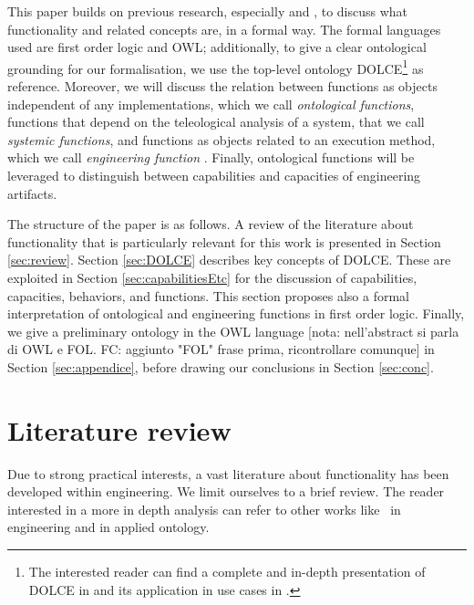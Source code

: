 \documentclass[sw]{iosart2x}
\newcommand{\DOLCE}{\textsc{DOLCE}\xspace} %
\newcommand{\OWL}{\textnormal{OWL}\xspace}
\newcommand{\firstTimeKeyWord}[1]{\textit{#1}}
\newcommand{\TODO}[1]{{\color{red} #1}}
\begin{document}
This paper builds on previous research, especially \cite{borgoCapabilitiesCapacitiesFunctionalities2021} and \cite{mizoguchiUnifyingDefinitionArtifact2016}, to discuss what functionality and related concepts are, in a formal way. 
The formal languages used are first order logic and \OWL; additionally, to give a clear ontological grounding for our formalisation, we use the top-level ontology \DOLCE\footnote{The interested reader can find a complete and in-depth presentation of \DOLCE in \cite{masoloWonderWebDeliverableD182003} and its application in use cases in \cite{borgoDOLCEDescriptiveOntology2022}.} as reference. 
Moreover, we will discuss the relation between functions as objects independent of any implementations, which we call \firstTimeKeyWord{ontological functions}, functions that depend on the teleological analysis of a system, that we call \firstTimeKeyWord{systemic functions}, and functions as objects related to an execution method, which we call \firstTimeKeyWord{engineering function}%
.
Finally, ontological functions will be leveraged to  distinguish between capabilities and capacities of engineering artifacts.   

The structure of the paper is as follows. A review of the literature about functionality that is particularly relevant for this work is presented in Section \ref{sec:review}. 
Section \ref{sec:DOLCE} describes key concepts of \DOLCE. These are exploited in Section \ref{sec:capabilitiesEtc} for the discussion of capabilities, capacities, behaviors, and functions. This section proposes also a formal interpretation of ontological and engineering functions in first order logic. 
Finally, we give a preliminary ontology in the \OWL language\TODO{[nota: nell'abstract si parla di OWL e FOL. FC: aggiunto "FOL" frase prima, ricontrollare comunque]} in Section \ref{sec:appendice}, before drawing our conclusions in Section \ref{sec:conc}. 

\section{Literature review\label{sec:review}}%
Due to strong practical interests, a vast literature about functionality has been developed within engineering. 
We limit ourselves to a brief review. The reader interested in a more in depth analysis can refer to other works like~\cite{erdenReviewFunctionModeling2008} in engineering and \cite{artigaNewPerspectiveOnFunctions} in applied ontology.
\end{document}
